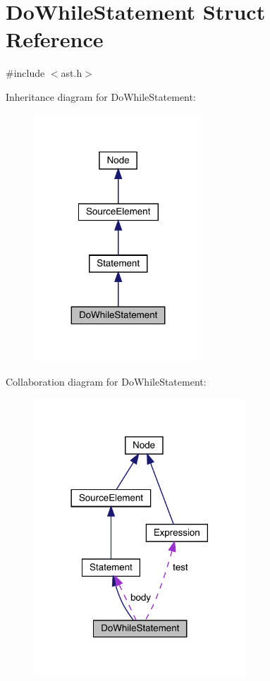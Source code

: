 \hypertarget{struct_do_while_statement}{}\section{Do\+While\+Statement Struct Reference}
\label{struct_do_while_statement}


{\ttfamily \#include $<$ast.\+h$>$}



Inheritance diagram for Do\+While\+Statement\+:\nopagebreak
\begin{figure}[H]
\begin{center}
\leavevmode
\includegraphics[width=179pt]{struct_do_while_statement__inherit__graph}
\end{center}
\end{figure}


Collaboration diagram for Do\+While\+Statement\+:\nopagebreak
\begin{figure}[H]
\begin{center}
\leavevmode
\includegraphics[width=225pt]{struct_do_while_statement__coll__graph}
\end{center}
\end{figure}

